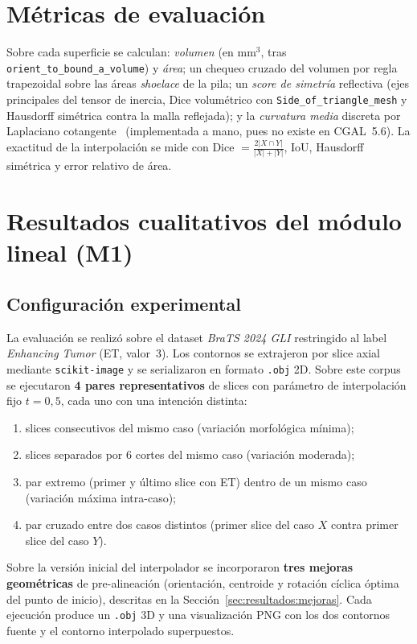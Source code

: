 \documentclass[conference]{IEEEtran}
\begin{document}
\section{Métricas de evaluación}
\label{sec:metricas}
Sobre cada superficie se calculan: \emph{volumen} (en mm$^3$, tras
\texttt{orient\_to\_bound\_a\_volume}) y \emph{área}; un chequeo cruzado del
volumen por regla trapezoidal sobre las áreas \emph{shoelace} de la pila; un
\emph{score de simetría} reflectiva (ejes principales del tensor de
inercia, Dice volumétrico con \texttt{Side\_of\_triangle\_mesh} y Hausdorff
simétrica contra la malla reflejada); y la \emph{curvatura media} discreta
por Laplaciano cotangente~\cite{meyer2003} (implementada a mano, pues no
existe en CGAL~5.6). La exactitud de la interpolación se mide con Dice
$=\tfrac{2|X\cap Y|}{|X|+|Y|}$, IoU, Hausdorff simétrica y error relativo de
área.

\section{Resultados cualitativos del módulo lineal (M1)}
\label{sec:resultados}

\subsection{Configuración experimental}
\label{sec:resultados:config}
La evaluación se realizó sobre el dataset
\textit{BraTS 2024 GLI} restringido al label
\textit{Enhancing Tumor} (ET, valor~$3$). Los contornos se
extrajeron por slice axial mediante \texttt{scikit-image} y
se serializaron en formato \texttt{.obj} 2D. Sobre este
corpus se ejecutaron \textbf{4 pares representativos} de
slices con parámetro de interpolación fijo $t = 0{,}5$,
cada uno con una intención distinta:
\begin{enumerate}
  \item slices consecutivos del mismo caso (variación
        morfológica mínima);
  \item slices separados por 6 cortes del mismo caso
        (variación moderada);
  \item par extremo (primer y último slice con ET) dentro de
        un mismo caso (variación máxima intra-caso);
  \item par cruzado entre dos casos distintos (primer slice
        del caso $X$ contra primer slice del caso $Y$).
\end{enumerate}
Sobre la versión inicial del interpolador se incorporaron
\textbf{tres mejoras geométricas} de pre-alineación
(orientación, centroide y rotación cíclica óptima del punto
de inicio), descritas en la Sección~\ref{sec:resultados:mejoras}.
Cada ejecución produce un \texttt{.obj} 3D y una
visualización PNG con los dos contornos fuente y el contorno
interpolado superpuestos.
\end{document}

